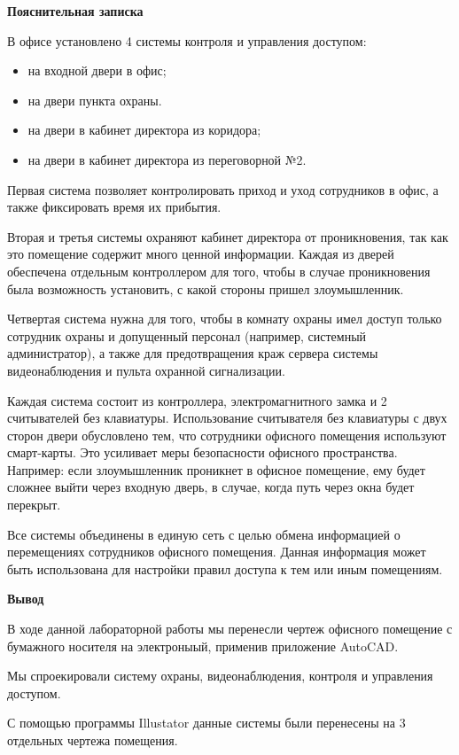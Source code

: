 \documentclass[a4paper,14pt]{extarticle}
\begin{document}
    \textbf{Пояснительная записка}
    \begin{spacing}{1.25}
        В офисе установлено 4 системы контроля и управления доступом:
        \vspace{-1ex}
        \begin{spacing}{0.5}
            \begin{itemize}
                \item на входной двери в офис;
                \item на двери пункта охраны.
                \item на двери в кабинет директора из коридора;
                \item на двери в кабинет директора из переговорной №2.
            \end{itemize}
        \end{spacing}
        Первая система позволяет контролировать приход и уход сотрудников в офис, а также фиксировать время их прибытия. 
        
        Вторая и третья системы охраняют кабинет директора от проникновения, так как это помещение содержит много ценной информации. Каждая из дверей обеспечена отдельным контроллером для того, чтобы в случае проникновения была возможность установить, с какой стороны пришел злоумышленник. 
        
        Четвертая система нужна для того, чтобы в комнату охраны имел доступ только сотрудник охраны и допущенный персонал (например, системный администратор), а также для предотвращения краж сервера системы видеонаблюдения и пульта охранной сигнализации.

        Каждая система состоит из контроллера, электромагнитного замка и 2 считывателей
        без клавиатуры. Использование считывателя без клавиатуры с двух сторон двери обусловлено тем, что сотрудники офисного помещения используют смарт-карты. Это усиливает меры безопасности офисного пространства. Например: если злоумышленник проникнет в офисное помещение, ему будет сложнее выйти через входную дверь, в случае, когда путь через окна будет перекрыт.

        Все системы объединены в единую сеть с целью обмена информацией о перемещениях сотрудников офисного помещения. Данная информация может быть использована для настройки правил доступа к тем или иным помещениям. 
    \end{spacing}

    \vspace{3ex}
    \textbf{Вывод}

    В ходе данной лабораторной работы мы перенесли чертеж офисного помещение с бумажного носителя на электроныый, применив приложение AutoCAD. 

    Мы спроекировали систему охраны, видеонаблюдения, контроля и управления доступом. 

    С помощью программы Illustator данные системы были перенесены на 3 отдельных чертежа помещения.


 
    


    
    
\end{document}
